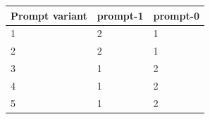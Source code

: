 \begin{center}\small\begin{tabular}{lll}\toprule
Prompt variant & prompt-1 & prompt-0 \\\midrule
1 & 2 & 1 \\
2 & 2 & 1 \\
3 & 1 & 2 \\
4 & 1 & 2 \\
5 & 1 & 2 \\
\bottomrule\end{tabular}\end{center}
